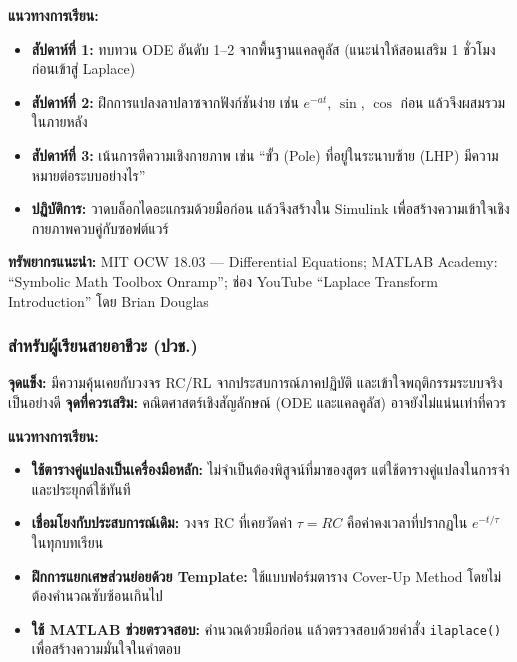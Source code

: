 \textbf{แนวทางการเรียน:}

\begin{itemize}
\tightlist
\item
  \textbf{สัปดาห์ที่ 1:} ทบทวน ODE อันดับ 1--2 จากพื้นฐานแคลคูลัส (แนะนำให้สอนเสริม
  1 ชั่วโมงก่อนเข้าสู่ Laplace)
\item
  \textbf{สัปดาห์ที่ 2:} ฝึกการแปลงลาปลาซจากฟังก์ชันง่าย เช่น \(e^{-at}\),
  \(\sin\), \(\cos\) ก่อน แล้วจึงผสมรวมในภายหลัง
\item
  \textbf{สัปดาห์ที่ 3:} เน้นการตีความเชิงกายภาพ เช่น ``ขั้ว (Pole) ที่อยู่ในระนาบซ้าย
  (LHP) มีความหมายต่อระบบอย่างไร''
\item
  \textbf{ปฏิบัติการ:} วาดบล็อกไดอะแกรมด้วยมือก่อน แล้วจึงสร้างใน Simulink
  เพื่อสร้างความเข้าใจเชิงกายภาพควบคู่กับซอฟต์แวร์
\end{itemize}

\textbf{ทรัพยากรแนะนำ:} MIT OCW 18.03 --- Differential Equations; MATLAB
Academy: ``Symbolic Math Toolbox Onramp''; ช่อง YouTube ``Laplace
Transform Introduction'' โดย Brian Douglas

\subsubsection{สำหรับผู้เรียนสายอาชีวะ
(ปวช.)}\label{uxe2auxe33uxe2buxe23uxe1auxe1cuxe40uxe23uxe22uxe19uxe2auxe32uxe22uxe2duxe32uxe0auxe27uxe30-uxe1buxe27uxe0a.}

\textbf{จุดแข็ง:} มีความคุ้นเคยกับวงจร RC/RL จากประสบการณ์ภาคปฏิบัติ
และเข้าใจพฤติกรรมระบบจริงเป็นอย่างดี \textbf{จุดที่ควรเสริม:} คณิตศาสตร์เชิงสัญลักษณ์
(ODE และแคลคูลัส) อาจยังไม่แน่นเท่าที่ควร

\textbf{แนวทางการเรียน:}

\begin{itemize}
\tightlist
\item
  \textbf{ใช้ตารางคู่แปลงเป็นเครื่องมือหลัก:} ไม่จำเป็นต้องพิสูจน์ที่มาของสูตร
  แต่ใช้ตารางคู่แปลงในการจำและประยุกต์ใช้ทันที
\item
  \textbf{เชื่อมโยงกับประสบการณ์เดิม:} วงจร RC ที่เคยวัดค่า \(\tau = RC\)
  คือค่าคงเวลาที่ปรากฏใน \(e^{-t/\tau}\) ในทุกบทเรียน
\item
  \textbf{ฝึกการแยกเศษส่วนย่อยด้วย Template:} ใช้แบบฟอร์มตาราง Cover-Up Method
  โดยไม่ต้องคำนวณซับซ้อนเกินไป
\item
  \textbf{ใช้ MATLAB ช่วยตรวจสอบ:} คำนวณด้วยมือก่อน แล้วตรวจสอบด้วยคำสั่ง
  \texttt{ilaplace()} เพื่อสร้างความมั่นใจในคำตอบ
\end{itemize}

